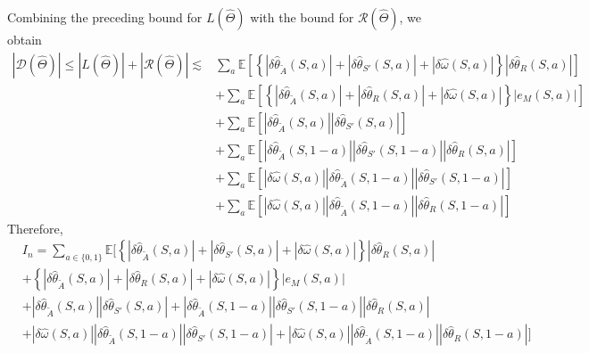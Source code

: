 \documentclass[12pt]{article}
\newcommand{\0}{\boldsymbol{0}}
\newcommand{\E}{\mathbb{E}}
\begin{document}
Combining the preceding bound for \(L(\widehat\Theta)\) with the bound for
\(\mathcal R(\widehat\Theta)\), we obtain
\begin{align*}
|\mathcal D(\widehat\Theta)|
\le |L(\widehat\Theta)|+|\mathcal R(\widehat\Theta)|
\lesssim &\sum_a\mathbb E\!\left[
\left\{|\delta\widehat\theta_{\widetilde A}(S,a)|
+|\delta\widehat\theta_{S'}(S,a)|
+|\delta\widehat\omega(S,a)|\right\}
|\delta\widehat\theta_R(S,a)|\right] \\
&+\sum_a\mathbb E\!\left[\left\{|\delta\widehat\theta_{\widetilde A}(S,a)|
+|\delta\widehat\theta_R(S,a)|
+|\delta\widehat\omega(S,a)|
\right\}|e_M(S,a)|\right] \\
&+\sum_a\mathbb E\!\left[
|\delta\widehat\theta_{\widetilde A}(S,a)|
|\delta\widehat\theta_{S'}(S,a)|
\right] \\
&+\sum_a\mathbb E\!\left[
|\delta\widehat\theta_{\widetilde A}(S,1-a)|
|\delta\widehat\theta_{S'}(S,1-a)|
|\delta\widehat\theta_R(S,a)|
\right] \\
&+\sum_a\mathbb E\!\left[
|\delta\widehat\omega(S,a)|
|\delta\widehat\theta_{\widetilde A}(S,1-a)|
|\delta\widehat\theta_{S'}(S,1-a)|
\right] \\
&+\sum_a\mathbb E\!\left[
|\delta\widehat\omega(S,a)|
|\delta\widehat\theta_{\widetilde A}(S,1-a)|
|\delta\widehat\theta_R(S,1-a)|
\right] 
\end{align*}
Therefore, 
\begin{align*}
&I_n = \sum_{a\in\{0,1\}}\E\Big[
\left\{|\delta\widehat\theta_{\widetilde A}(S,a)|
+|\delta\widehat\theta_{S'}(S,a)|
+|\delta\widehat\omega(S,a)|\right\}
|\delta\widehat\theta_R(S,a)| \\
&+ \left\{|\delta\widehat\theta_{\widetilde A}(S,a)|
+|\delta\widehat\theta_R(S,a)|
+|\delta\widehat\omega(S,a)|
\right\}|e_M(S,a)| \\
&+ |\delta\widehat\theta_{\widetilde A}(S,a)|
|\delta\widehat\theta_{S'}(S,a)| + 
|\delta\widehat\theta_{\widetilde A}(S,1-a)|
|\delta\widehat\theta_{S'}(S,1-a)|
|\delta\widehat\theta_R(S,a)| \\
&+
|\delta\widehat\omega(S,a)|
|\delta\widehat\theta_{\widetilde A}(S,1-a)|
|\delta\widehat\theta_{S'}(S,1-a)|
+
|\delta\widehat\omega(S,a)|
|\delta\widehat\theta_{\widetilde A}(S,1-a)|
|\delta\widehat\theta_R(S,1-a)|
\Big] 
\end{align*}
\end{document}
